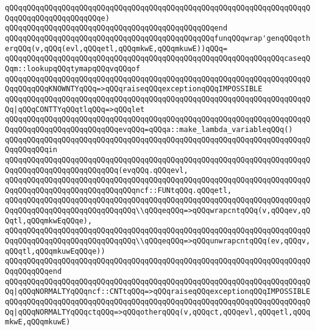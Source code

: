 \verb|qQQqqQQqqQQqqQQqqQQqqQQqqQQqqQQqqQQqqQQqqQQqqQQqqQQqqQQqqQQqqQQqqQQqqQQqqQQqqQQqqQQqqQQqqQQqe)|\newline
\verb|qQQqqQQqqQQqqQQqqQQqqQQqqQQqqQQqqQQqqQQqqQQqqQQqend|\newline
\newline
\verb|qQQqqQQqqQQqqQQqqQQqqQQqqQQqqQQqqQQqqQQqqQQqqQQqfunqQQqwrap'genqQQqotherqQQq(v,qQQq(evl,qQQqetl,qQQqmkwE,qQQqmkuwE))qQQq=|\newline
\verb|qQQqqQQqqQQqqQQqqQQqqQQqqQQqqQQqqQQqqQQqqQQqqQQqqQQqqQQqqQQqqQQqcaseqQQqm::lookupqQQqtymapqQQqvqQQqof|\newline
\verb|qQQqqQQqqQQqqQQqqQQqqQQqqQQqqQQqqQQqqQQqqQQqqQQqqQQqqQQqqQQqqQQqqQQqqQQqqQQqqQQqKNOWNTYqQQq=>qQQqraiseqQQqexceptionqQQqIMPOSSIBLE|\newline
\verb|qQQqqQQqqQQqqQQqqQQqqQQqqQQqqQQqqQQqqQQqqQQqqQQqqQQqqQQqqQQqqQQqqQQqqQQq|\verb#|qQQqCONTTYqQQqtlqQQq=>qQQqlet#\newline
\verb|qQQqqQQqqQQqqQQqqQQqqQQqqQQqqQQqqQQqqQQqqQQqqQQqqQQqqQQqqQQqqQQqqQQqqQQqqQQqqQQqqQQqqQQqqQQqqQQqevqQQq=qQQqa::make_lambda_variableqQQq()|\newline
\verb|qQQqqQQqqQQqqQQqqQQqqQQqqQQqqQQqqQQqqQQqqQQqqQQqqQQqqQQqqQQqqQQqqQQqqQQqqQQqqQQqin|\newline
\verb|qQQqqQQqqQQqqQQqqQQqqQQqqQQqqQQqqQQqqQQqqQQqqQQqqQQqqQQqqQQqqQQqqQQqqQQqqQQqqQQqqQQqqQQqqQQqqQQq(evqQQq.qQQqevl,|\newline
\verb|qQQqqQQqqQQqqQQqqQQqqQQqqQQqqQQqqQQqqQQqqQQqqQQqqQQqqQQqqQQqqQQqqQQqqQQqqQQqqQQqqQQqqQQqqQQqqQQqqQQqncf::FUNtqQQq.qQQqetl,|\newline
\verb|qQQqqQQqqQQqqQQqqQQqqQQqqQQqqQQqqQQqqQQqqQQqqQQqqQQqqQQqqQQqqQQqqQQqqQQqqQQqqQQqqQQqqQQqqQQqqQQqqQQq\\qQQqeqQQq=>qQQqwrapcntqQQq(v,qQQqev,qQQqtl,qQQqmkwEqQQqe),|\newline
\verb|qQQqqQQqqQQqqQQqqQQqqQQqqQQqqQQqqQQqqQQqqQQqqQQqqQQqqQQqqQQqqQQqqQQqqQQqqQQqqQQqqQQqqQQqqQQqqQQqqQQq\\qQQqeqQQq=>qQQqunwrapcntqQQq(ev,qQQqv,qQQqtl,qQQqmkuwEqQQqe))|\newline
\verb|qQQqqQQqqQQqqQQqqQQqqQQqqQQqqQQqqQQqqQQqqQQqqQQqqQQqqQQqqQQqqQQqqQQqqQQqqQQqqQQqend|\newline
\verb|qQQqqQQqqQQqqQQqqQQqqQQqqQQqqQQqqQQqqQQqqQQqqQQqqQQqqQQqqQQqqQQqqQQqqQQq|\verb#|qQQqNORMALTYqQQqncf::CNTtqQQq=>qQQqraiseqQQqexceptionqQQqIMPOSSIBLE#\newline
\verb|qQQqqQQqqQQqqQQqqQQqqQQqqQQqqQQqqQQqqQQqqQQqqQQqqQQqqQQqqQQqqQQqqQQqqQQq|\verb#|qQQqNORMALTYqQQqctqQQq=>qQQqotherqQQq(v,qQQqct,qQQqevl,qQQqetl,qQQqmkwE,qQQqmkuwE)#\newline
